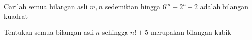 \documentclass[11pt]{scrartcl}
\begin{document}
\begin{problem}
    Carilah semua bilangan asli $m,n$ sedemikian hingga $6^m + 2^n + 2$ adalah bilangan kuadrat
\end{problem}

\begin{problem}
    Tentukan semua bilangan asli $n$ sehingga $n! + 5$ merupakan bilangan kubik
\end{problem}

\end{document}
